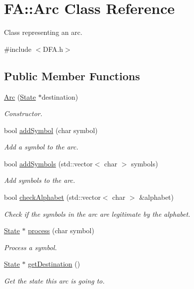 \hypertarget{classFA_1_1Arc}{\section{F\-A\-:\-:Arc Class Reference}
\label{classFA_1_1Arc}
}


Class representing an arc.  




{\ttfamily \#include $<$D\-F\-A.\-h$>$}

\subsection*{Public Member Functions}
\begin{DoxyCompactItemize}
\item 
\hyperlink{classFA_1_1Arc_aed14dd25143634f1796d1b3866b81a39}{Arc} (\hyperlink{classFA_1_1State}{State} $\ast$destination)
\begin{DoxyCompactList}\small\item\em Constructor. \end{DoxyCompactList}\item 
bool \hyperlink{classFA_1_1Arc_a015600997b525562db9bc7e1ce8293f6}{add\-Symbol} (char symbol)
\begin{DoxyCompactList}\small\item\em Add a symbol to the arc. \end{DoxyCompactList}\item 
bool \hyperlink{classFA_1_1Arc_a4831f1b25de677667d80e6147e38cf14}{add\-Symbols} (std\-::vector$<$ char $>$ symbols)
\begin{DoxyCompactList}\small\item\em Add symbols to the arc. \end{DoxyCompactList}\item 
bool \hyperlink{classFA_1_1Arc_a8bd99b8e8414cb0d2384c123593617b0}{check\-Alphabet} (std\-::vector$<$ char $>$ \&alphabet)
\begin{DoxyCompactList}\small\item\em Check if the symbols in the arc are legitimate by the alphabet. \end{DoxyCompactList}\item 
\hyperlink{classFA_1_1State}{State} $\ast$ \hyperlink{classFA_1_1Arc_a97e6df2bfbcb08253eae0c15db40e571}{process} (char symbol)
\begin{DoxyCompactList}\small\item\em Process a symbol. \end{DoxyCompactList}\item 
\hyperlink{classFA_1_1State}{State} $\ast$ \hyperlink{classFA_1_1Arc_a1276923880acf8af934fea8c07dac610}{get\-Destination} ()
\begin{DoxyCompactList}\small\item\em Get the state this arc is going to. \end{DoxyCompactList}\end{DoxyCompactItemize}
